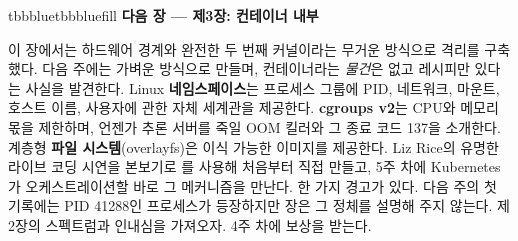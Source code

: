 \vspace{5.0pt}

\begin{calloutbox}{tbbblue}{tbbbluefill}
{\normalsize\bfseries\color{tbbblue}다음 장 — 제3장: 컨테이너 내부}\par\vspace{3pt}
이 장에서는 하드웨어 경계와 완전한 두 번째 커널이라는 무거운 방식으로 격리를 구축했다. 다음 주에는 가벼운 방식으로 만들며, 컨테이너라는 \textit{물건}은 없고 레시피만 있다는 사실을 발견한다. Linux \textbf{네임스페이스}는 프로세스 그룹에 PID, 네트워크, 마운트, 호스트 이름, 사용자에 관한 자체 세계관을 제공한다. \textbf{cgroups v2}는 CPU와 메모리 몫을 제한하며, 언젠가 추론 서버를 죽일 OOM 킬러와 그 종료 코드 137을 소개한다. 계층형 \textbf{파일 시스템}(overlayfs)은 이식 가능한 이미지를 제공한다. Liz Rice의 유명한 라이브 코딩 시연을 본보기로 를 사용해 처음부터 직접 만들고, 5주 차에 Kubernetes가 오케스트레이션할 바로 그 메커니즘을 만난다. 한 가지 경고가 있다. 다음 주의 첫 기록에는 PID 41288인 프로세스가 등장하지만 장은 그 정체를 설명해 주지 않는다. 제2장의 스펙트럼과 인내심을 가져오자. 4주 차에 보상을 받는다.
\end{calloutbox}
